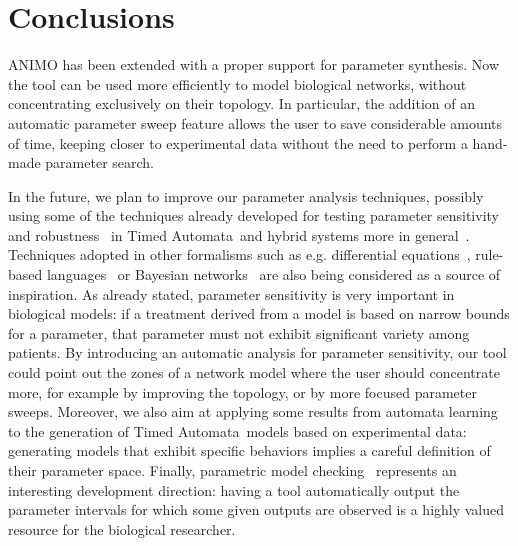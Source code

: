 \documentclass[submission,copyright,creativecommons]{eptcs}
\def\tas{Timed Automata}
\begin{document}
\section{Conclusions}
ANIMO has been extended with a proper support for parameter synthesis. Now the tool can be used more efficiently
to model biological networks, without concentrating exclusively on their topology.
In particular, the addition of an automatic parameter sweep feature allows the user
to save considerable amounts of time, keeping closer to experimental data without the need
to perform a hand-made parameter search.

In the future, we plan to improve our parameter analysis techniques, possibly using some of
the techniques already developed for testing parameter sensitivity~\cite{inverse-ta1, inverse-ta2} and
robustness~\cite{robust-ta1, robust-ta2, robust-ta3, robust-ta4} in \tas\ and hybrid systems more in general~\cite{decidability-ta-ha, imitator2}.
Techniques adopted in other formalisms such as e.g. differential equations~\cite{copasi, breach, kinfer}, rule-based languages~\cite{biocham, rulebender}
or Bayesian networks~\cite{bayes-infer} are also being
considered as a source of inspiration.
As already stated, parameter sensitivity is very important in biological models: if a treatment
derived from a model is based on narrow bounds for a parameter, that parameter must not exhibit significant
variety among patients. By introducing an automatic analysis for parameter sensitivity, our tool
could point out the zones of a network model where the user should concentrate more, for example by
improving the topology, or by more focused parameter sweeps.
Moreover, we also aim at applying some results from automata learning~\cite{test-based-modelling} to the generation of
\tas\ models based on experimental data: generating models that exhibit specific behaviors
implies a careful definition of their parameter space.
Finally, parametric model checking~\cite{param-mc} represents an interesting development direction:
having a tool automatically output the parameter intervals for which some
given outputs are observed is a highly valued resource for the biological researcher.
\end{document}
